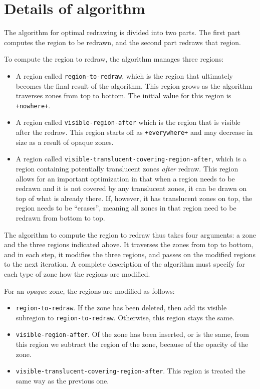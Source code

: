 \documentclass{report}
\begin{document}
\section{Details of algorithm}

The algorithm for optimal redrawing is divided into two parts.  The
first part computes the region to be redrawn, and the second part
redraws that region.

To compute the region to redraw, the algorithm manages three regions:

\begin{itemize}
\item A region called \texttt{region-to-redraw}, which is the region
  that ultimately becomes the final result of the algorithm.  This
  region grows as the algorithm traverses zones from top to bottom.
  The initial value for this region is \texttt{+nowhere+}.
\item A region called \texttt{visible-region-after} which is the
  region that is visible after the redraw.  This region starts off as
  \texttt{+everywhere+} and may decrease in size as a result of opaque
  zones.
\item A region called
  \texttt{visible-translucent-covering-region-after}, which is a
  region containing potentially translucent zones \emph{after}
  redraw.  This region allows for an important optimization in that
  when a region needs to be redrawn and it is not covered by any
  translucent zones, it can be drawn on top of what is already
  there.  If, however, it has translucent zones on top, the region
  needs to be ``erases'', meaning all zones in that region need to
  be redrawn from bottom to top. 
\end{itemize}

The algorithm to compute the region to redraw thus takes four
arguments: a zone and the three regions indicated above.  It
traverses the zones from top to bottom, and in each step, it
modifies the three regions, and passes on the modified regions to the
next iteration.  A complete description of the algorithm must specify
for each type of zone how the regions are modified. 

For an \emph{opaque} zone, the regions are modified as follows:

\begin{itemize}
\item \texttt{region-to-redraw}.  If the zone has been deleted, then
  add its visible subregion to \texttt{region-to-redraw}.  Otherwise,
  this region stays the same.
\item \texttt{visible-region-after}.  Of the zone has been inserted,
  or is the same, from this region we subtract the region of the
  zone, because of the opacity of the zone.
\item \texttt{visible-translucent-covering-region-after}.  This region
  is treated the same way as the previous one.
\end{itemize}
\end{document}
